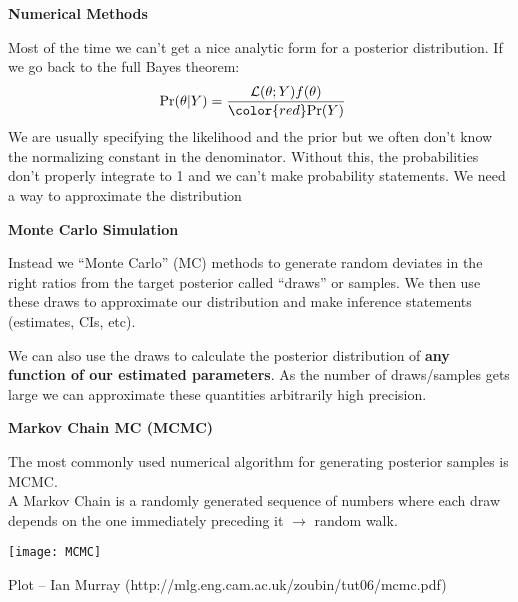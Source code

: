 \documentclass[12pt,xcolor=svgnames]{beamer}
\newcommand{\rd}{\color{red}}
\newcommand{\bl}{\color{blue}}
\newcommand{\theme}{\color{FireBrick}}
\newcommand{\sk}{\vspace{.4cm}}
\newcommand{\chap}[1]{{\theme \Large \bf #1} \sk}
\begin{document}
\iffalse

\begin{frame}
\chap{Numerical Methods}

Most of the time we can't get a nice analytic form for a posterior distribution. If we go back to the full Bayes theorem:
\begin{align*}
\text{Pr}(\theta|Y) & = \frac{\mathcal{L}(\theta; Y)f(\theta)}{{\rd \text{Pr}(Y)}}
\end{align*}
We are usually specifying the likelihood and the prior but we often don't know the normalizing constant in the denominator. Without this, the probabilities don't properly integrate to 1 and we {\rd can't make probability statements}. We need a way to approximate the distribution \\
\end{frame}

\begin{frame}
\chap{Monte Carlo Simulation}

Instead we ``Monte Carlo'' (MC) methods to generate random deviates in the right ratios from the target posterior called ``{\bl draws}'' or samples. We then use these draws to approximate our distribution and make inference statements (estimates, CIs, etc). 

\sk
We can also use the draws to calculate the posterior distribution of {\bf \bl any function of our estimated parameters}. As the number of draws/samples gets large we can approximate these quantities arbitrarily high precision.


\end{frame}


\begin{frame}
\chap{Markov Chain MC (MCMC)}

The most commonly used numerical algorithm for generating posterior samples is MCMC. \\

\sk
A {\bl Markov Chain} is a randomly generated sequence of numbers where each draw depends on the one immediately preceding it $\rightarrow$ random walk.


\begin{center}
\hspace{2.75cm} \texttt{[image: MCMC]}
\end{center}

\vfill
\hfill {\tiny Plot -- Ian Murray (http://mlg.eng.cam.ac.uk/zoubin/tut06/mcmc.pdf)} 
\end{frame}
\end{document}
